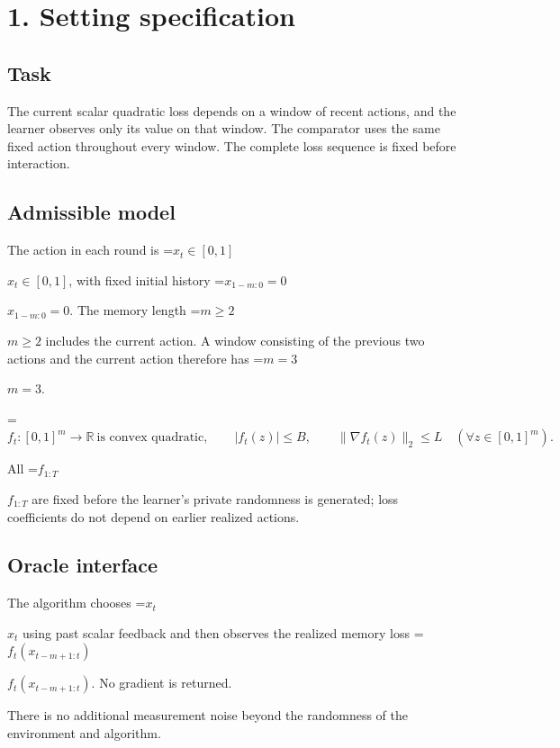 \documentclass[10pt,a4paper]{article}
\newcommand{\AtlasMath}[1]{\par\begingroup\centering\setbox0=\hbox{$\displaystyle #1$}\ifdim\wd0>1.4\linewidth\typeout{ATLAS WIDE FORMULA: \the\wd0}\fi\ifdim\wd0>\linewidth\resizebox{\linewidth}{!}{\box0}\else\box0\fi\par\endgroup}
\newcommand{\AtlasInlineMath}[1]{\begingroup\setbox0=\hbox{$#1$}\ifdim\wd0>.4\linewidth\endgroup\AtlasMath{#1}\else\endgroup$#1$\fi}
\begin{document}
\section{1. Setting specification}


\subsection{Task}


The current scalar quadratic loss depends on a window of recent actions, and the learner observes only its value on that window. The comparator uses the same fixed action throughout every window. The complete loss sequence is fixed before interaction.



\subsection{Admissible model}


The action in each round is \AtlasInlineMath{x_t\in[0,1]}, with fixed initial history \AtlasInlineMath{x_{1-m:0}=0}. The memory length \AtlasInlineMath{m\ge2} includes the current action. A window consisting of the previous two actions and the current action therefore has \AtlasInlineMath{m=3}.




\AtlasMath{f_t:[0,1]^m\to\mathbb R\ \text{is convex quadratic},\qquad |f_t(z)|\le B,\qquad \|\nabla f_t(z)\|_2\le L\quad(\forall z\in[0,1]^m).}




All \AtlasInlineMath{f_{1:T}} are fixed before the learner's private randomness is generated; loss coefficients do not depend on earlier realized actions.



\subsection{Oracle interface}


The algorithm chooses \AtlasInlineMath{x_t} using past scalar feedback and then observes the realized memory loss \AtlasInlineMath{f_t(x_{t-m+1:t})}. No gradient is returned.



There is no additional measurement noise beyond the randomness of the environment and algorithm.
\end{document}
